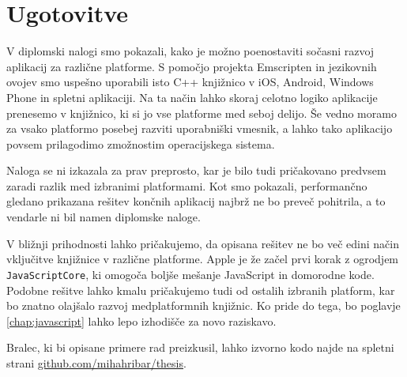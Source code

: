 








\chapter{Ugotovitve}
\label{chap:conclusion}

V diplomski nalogi smo pokazali, kako je možno poenostaviti sočasni razvoj aplikacij za različne platforme. S pomočjo projekta Emscripten in jezikovnih ovojev smo uspešno uporabili isto C++ knjižnico v iOS, Android, Windows Phone in spletni aplikaciji. Na ta način lahko skoraj celotno logiko aplikacije prenesemo v knjižnico, ki si jo vse platforme med seboj delijo. Še vedno moramo za vsako platformo posebej razviti uporabniški vmesnik, a lahko tako aplikacijo povsem prilagodimo zmožnostim operacijskega sistema.

Naloga se ni izkazala za prav preprosto, kar je bilo tudi pričakovano predvsem zaradi razlik med izbranimi platformami. Kot smo pokazali, performančno gledano prikazana rešitev končnih aplikacij najbrž ne bo preveč pohitrila, a to vendarle ni bil namen diplomske naloge.

V bližnji prihodnosti lahko pričakujemo, da opisana rešitev ne bo več edini način vključitve knjižnice v različne platforme. Apple je že začel prvi korak z ogrodjem \texttt{JavaScriptCore}, ki omogoča boljše mešanje JavaScript in domorodne kode. Podobne rešitve lahko kmalu pričakujemo tudi od ostalih izbranih platform, kar bo znatno olajšalo razvoj medplatformnih knjižnic. Ko pride do tega, bo poglavje \ref{chap:javascript} lahko lepo izhodišče za novo raziskavo.

Bralec, ki bi opisane primere rad preizkusil, lahko izvorno kodo najde na spletni strani \href{https://github.com/mihahribar/thesis}{github.com/mihahribar/thesis}.